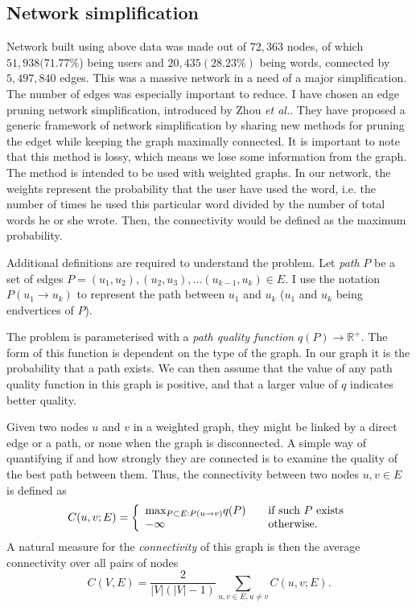   \subsection{Network simplification}

    Network built using above data was made out of $72,363$ nodes, of which $51,938 (71.77\%$) being users and $20,435 (28.23\%)$ being words, connected by $5,497,840$ edges. This was a massive network in a need of a major simplification. The number of edges was especially important to reduce. I have chosen an edge pruning network simplification, introduced by Zhou \textit{et al.}\cite{ZhouMahlerToivonen2012}. They have proposed a generic framework of network simplification by sharing new methods for pruning the edget while keeping the graph maximally connected. It is important to note that this method is lossy, which means we lose some information from the graph. The method is intended to be used with weighted graphs. In our network, the weights represent the probability that the user have used the word, i.e. the number of times he used this particular word divided by the number of total words he or she wrote. Then, the connectivity would be defined as the maximum probability.
    
    Additional definitions are required to understand the problem. Let \emph{path} $P$ be a set of edges $P = {(u_1, u_2), (u_2, u_3), \ldots (u_{k-1}, u_k)} \in E$. I use the notation $P(u_1 \to u_k)$ to represent the path between $u_1$ and $u_k$ ($u_1$ and $u_k$ being endvertices of $P$).
  
    The problem is parameterised with a \emph{path quality function} $q(P) \to \mathbb{R}^+$. The form of this function is dependent on the type of the graph. In our graph it is the probability that a path exists. We can then assume that the value of any path quality function in this graph is positive, and that a larger value of $q$ indicates better quality.
    
    Given two nodes $u$ and $v$ in a weighted graph, they might be linked by a direct edge or a path, or none when the graph is disconnected. A simple way of quantifying if and how strongly they are connected is to examine the quality of the best path between them\cite{ToivonenMahlerZhou2010}. Thus, the connectivity between two nodes $u, v \in E$ is defined as
    \begin{equation}
      C(u, v; E) = \left\{
      \begin{array}{l l}
        \mbox{max}_{P \subset E: P(u \to v)} q(P) & \quad \text{if such $P$ exists}\\
        -\infty & \quad \text{otherwise.}
      \end{array}
      \right.
    \end{equation}
    A natural measure for the \emph{connectivity} of this graph is then the average connectivity over all pairs of nodes
    \begin{equation}
    C(V, E) = \frac{2}{|V|(|V|-1)} \sum_{u, v\in E, u \neq v} C(u, v; E) \mbox{.}
    \end{equation}
    
